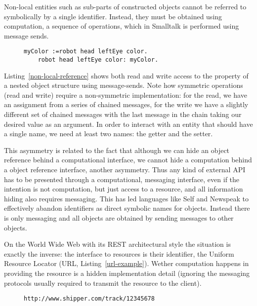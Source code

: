 \documentclass[preprint,authoryear]{acm_proc_article-sp}
\begin{document}
Non-local entities such as sub-parts of constructed objects 
cannot be referred to symbolically by a single identifier.
Instead, they must be obtained using computation, a 
sequence of operations, which in Smalltalk is performed using message sends.



\begin{figure}[htbp]
\begin{lstlisting}[style=L,label=non-local-reference,caption=Accessing objects via chained message sends.]
	myColor :=robot head leftEye color.
	robot head leftEye color: myColor.
\end{lstlisting}
\end{figure}

Listing~\ref{non-local-reference} shows both read and write access to the property
of a nested object structure using message-sends.  Note how symmetric operations
(read and write) require a non-symmetric implementation:  for the read, we have an assignment
from a series of chained messages, for the write we have a slightly different set of 
chained messages with the last message in the chain taking our desired value
as an argument.  In order to interact with an entity that should have a single name,
we need at least two names:  the getter and the setter.

This asymmetry is related to the fact that although we can hide an object reference 
behind a computational interface, we cannot
hide a computation behind a object reference interface, another asymmetry.
Thus any kind of external API has to be presented through a computational, messaging 
interface, even if the intention is not computation, but just access to a resource,
  and all information hiding also requires messaging.  This has led languages
like Self \cite{UngarS87} and Newspeak \cite{newspeak} to effectively abandon identifiers as direct symbolic names for objects. Instead there is only messaging and
all objects are obtained by sending messages to other objects.

On the World Wide Web with its REST architectural style the situation is exactly the inverse: 
the interface to resources is their identifier, the Uniform Resource Locator (URL, Listing~\ref{url-example}).
Wether computation happens in providing the resource is a hidden implementation detail
(ignoring the messaging protocols usually required to transmit the resource
to the client).  


\begin{figure}[htbp]
\begin{lstlisting}[style=L,label=url-example,caption=A Uniform Resource Locator.]
http://www.shipper.com/track/12345678
\end{lstlisting}
\end{figure}
\end{document}
